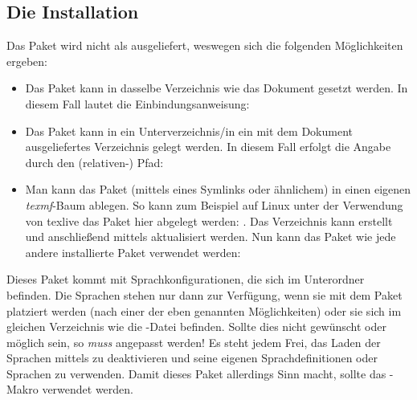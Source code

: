 \documentclass{sopra-base}
\begin{document}
\subsection{Die Installation}
    Das Paket wird nicht als  ausgeliefert, weswegen sich die 
    folgenden Möglichkeiten ergeben:
    \begin{itemize}
        \item Das Paket kann in dasselbe Verzeichnis wie das Dokument
                gesetzt werden. In diesem Fall lautet die Einbindungsanweisung:
\begin{plainlatex}
\usepackage{sopra-listings}
\end{plainlatex}
        \item Das Paket kann in ein Unterverzeichnis/in ein mit
                dem Dokument ausgeliefertes Verzeichnis gelegt werden. In
                diesem Fall erfolgt die Angabe durch den (relativen-) Pfad:
\begin{plainlatex}
\usepackage{./Mein/Pfad/zu/sopra-listings}
\end{plainlatex}
        \item Man kann das Paket (mittels eines Symlinks oder ähnlichem)
              in einen eigenen \emph{texmf}-Baum ablegen.
              So kann zum Beispiel auf Linux unter der Verwendung von texlive
              das Paket hier abgelegt werden: .
              Das Verzeichnis kann erstellt und anschließend mittels
               aktualisiert werden. Nun kann
              das Paket wie jede andere installierte Paket verwendet werden:
\begin{plainlatex}
\usepackage{sopra-listings}
\end{plainlatex}
    \end{itemize}

     Dieses Paket kommt mit Sprachkonfigurationen, die sich im Unterordner  befinden. Die Sprachen stehen nur dann zur Verfügung,
    wenn sie mit dem Paket platziert werden (nach einer der eben genannten Möglichkeiten) oder sie sich im gleichen Verzeichnis wie die \LaTeXe-Datei befinden. Sollte dies
    nicht gewünscht oder möglich sein, so \emph{muss}  angepasst werden! Es steht jedem Frei, das Laden der Sprachen mittels  zu deaktivieren und seine eigenen Sprachdefinitionen
    oder Sprachen zu verwenden. Damit dieses Paket allerdings Sinn macht, sollte das -Makro verwendet werden.
\end{document}
